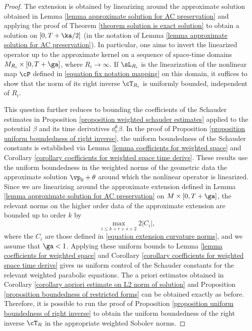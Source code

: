 \documentclass[hidelinks, 12pt, oneside, reqno]{amsart}
\begin{document}
\begin{proof}
The extension is obtained by linearizing around the approximate solution obtained in Lemma \ref{lemma approximate solution for AC preservation} and applying the proof of Theorem \ref{theorem solution is exact solution} to obtain a solution on $[0, T + \ka/2]$ (in the notation of Lemma \ref{lemma approximate solution for AC preservation}). In particular, one aims to invert the linearized operator up to the approximate kernel on a sequence of space-time domains $M_{R_i} \times [0,T+ \ga]$, where $R_i \rightarrow \infty$. If $\sL_{R_i}$ is the linearization of the nonlinear map $\cP$ defined in \eqref{equation fix notation mapping} on this domain, it suffices to show that the norm of its right inverse $\cT_{R_i}$ is uniformly bounded, independent of $R_i$.

This question further reduces to bounding the coefficients of the Schauder estimates in Proposition \ref{proposition weighted schauder estimates} applied to the potential $\beta$ and its time derivatives $\dd_t^k\beta$. In the proof of Proposition \ref{proposition uniform boundedness of right inverse}, the uniform boundedness of the Schauder constants is established via Lemma \ref{lemma coefficients for weighted space} and Corollary \ref{corollary coefficients for weighted space time derivs}. These results use the uniform boundedness in the weighted norms of the geometric data the approximate solution $\vp_0 + \theta$ around which the nonlinear operator is linearized.  Since we are linearizing around the approximate extension defined in Lemma \ref{lemma approximate solution for AC preservation} on $M \times [0, T + \ga]$, the relevant norms on the higher order data of the approximate extension are bounded up to order $k$ by
\[
\max_{i \le k+r+s+2} 2|C_i|,
\]
where the $C_i$ are those defined in \eqref{equation extension curvature norms}, and we assume that $\ga < 1$. Applying these uniform bounds to Lemma \ref{lemma coefficients for weighted space} and Corollary \ref{corollary coefficients for weighted space time derivs} gives us uniform control of the Schauder constants for the relevant weighted parabolic equations. The a priori estimates obtained in Corollary \ref{corollary apriori estimate on L2 norm of solution} and Proposition \ref{proposition boundedness of restricted forms} can be obtained exactly as before. Therefore, it is possible to run the proof of Proposition \ref{proposition uniform boundedness of right inverse} to obtain the uniform boundedness of the right inverse $\cT_{R}$ in the appropriate weighted Sobolev norms. 


\end{proof}
\end{document}
